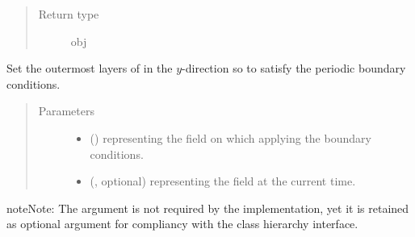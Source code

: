 \documentclass[letterpaper,10pt,english]{sphinxmanual}
\begin{document}
\begin{fulllineitems}
\begin{fulllineitems}
\begin{quote}
\begin{description}
\item[{Return type}] \leavevmode
obj

\end{description}\end{quote}

\end{fulllineitems}


\begin{fulllineitems}
\label{\detokenize{api:tasmania.dycore.horizontal_boundary_periodic.PeriodicYZ.set_outermost_layers_y}}
Set the outermost layers of  in the \(y\)-direction so to satisfy the periodic
boundary conditions.
\begin{quote}\begin{description}
\item[{Parameters}] \leavevmode\begin{itemize}
\item {} 
 () \textendash{}  representing the field on which applying the boundary conditions.

\item {} 
 (, optional) \textendash{}  representing the field at the current time.

\end{itemize}

\end{description}\end{quote}

\begin{sphinxadmonition}{note}{Note:}
The argument  is not required by the implementation, yet it is retained as optional
argument for compliancy with the class hierarchy interface.
\end{sphinxadmonition}

\end{fulllineitems}


\end{fulllineitems}
\end{document}
